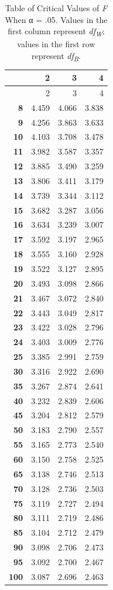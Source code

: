 \documentclass[
]{krantz}
\begin{document}
\begin{longtable}[]{@{}rrrr@{}}
\caption{\label{tab:fcrit} Table of Critical Values of \emph{F} When α = .05. Values in the first column represent \emph{df\textsubscript{W}}; values in the first row represent \emph{df\textsubscript{B}}.}\tabularnewline
\toprule()
& 2 & 3 & 4 \\
\midrule()
\endfirsthead
\toprule()
& 2 & 3 & 4 \\
\midrule()
\endhead
\textbf{8} & 4.459 & 4.066 & 3.838 \\
\textbf{9} & 4.256 & 3.863 & 3.633 \\
\textbf{10} & 4.103 & 3.708 & 3.478 \\
\textbf{11} & 3.982 & 3.587 & 3.357 \\
\textbf{12} & 3.885 & 3.490 & 3.259 \\
\textbf{13} & 3.806 & 3.411 & 3.179 \\
\textbf{14} & 3.739 & 3.344 & 3.112 \\
\textbf{15} & 3.682 & 3.287 & 3.056 \\
\textbf{16} & 3.634 & 3.239 & 3.007 \\
\textbf{17} & 3.592 & 3.197 & 2.965 \\
\textbf{18} & 3.555 & 3.160 & 2.928 \\
\textbf{19} & 3.522 & 3.127 & 2.895 \\
\textbf{20} & 3.493 & 3.098 & 2.866 \\
\textbf{21} & 3.467 & 3.072 & 2.840 \\
\textbf{22} & 3.443 & 3.049 & 2.817 \\
\textbf{23} & 3.422 & 3.028 & 2.796 \\
\textbf{24} & 3.403 & 3.009 & 2.776 \\
\textbf{25} & 3.385 & 2.991 & 2.759 \\
\textbf{30} & 3.316 & 2.922 & 2.690 \\
\textbf{35} & 3.267 & 2.874 & 2.641 \\
\textbf{40} & 3.232 & 2.839 & 2.606 \\
\textbf{45} & 3.204 & 2.812 & 2.579 \\
\textbf{50} & 3.183 & 2.790 & 2.557 \\
\textbf{55} & 3.165 & 2.773 & 2.540 \\
\textbf{60} & 3.150 & 2.758 & 2.525 \\
\textbf{65} & 3.138 & 2.746 & 2.513 \\
\textbf{70} & 3.128 & 2.736 & 2.503 \\
\textbf{75} & 3.119 & 2.727 & 2.494 \\
\textbf{80} & 3.111 & 2.719 & 2.486 \\
\textbf{85} & 3.104 & 2.712 & 2.479 \\
\textbf{90} & 3.098 & 2.706 & 2.473 \\
\textbf{95} & 3.092 & 2.700 & 2.467 \\
\textbf{100} & 3.087 & 2.696 & 2.463 \\
\bottomrule()
\end{longtable}
\end{document}
